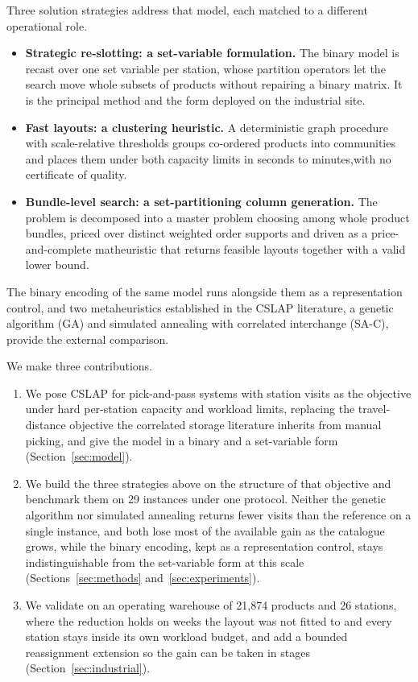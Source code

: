 \documentclass[]{interact}
\begin{document}
Three solution strategies address that model, each matched to a different operational role.
\begin{itemize}
\item \textbf{Strategic re-slotting: a set-variable formulation.} The binary model is recast over one set variable per station, whose partition operators let the search move whole subsets of products without repairing a binary matrix. It is the principal method and the form deployed on the industrial site.
\item \textbf{Fast layouts: a clustering heuristic.} A deterministic graph procedure with scale-relative thresholds groups co-ordered products into communities and places them under both capacity limits in seconds to minutes,with no certificate of quality.
\item \textbf{Bundle-level search: a set-partitioning column generation.} The problem is decomposed into a master problem choosing among whole product bundles, priced over distinct weighted order supports and driven as a price-and-complete matheuristic that returns feasible layouts together with a valid lower bound.
\end{itemize}
The binary encoding of the same model runs alongside them as a representation control, and two metaheuristics established in the CSLAP literature, a genetic algorithm (GA) and simulated annealing with correlated interchange (SA-C), provide the external comparison.

We make three contributions.
\begin{enumerate}
\item We pose CSLAP for pick-and-pass systems with station visits as the objective under hard per-station capacity and workload limits, replacing the travel-distance objective the correlated storage literature inherits from manual picking, and give the model in a binary and a set-variable form (Section~\ref{sec:model}).
\item We build the three strategies above on the structure of that objective and benchmark them on 29 instances under one protocol. Neither the genetic algorithm nor simulated annealing returns fewer visits than the reference on a single instance, and both lose most of the available gain as the catalogue grows, while the binary encoding, kept as a representation control, stays indistinguishable from the set-variable form at this scale (Sections~\ref{sec:methods} and~\ref{sec:experiments}).
\item We validate on an operating warehouse of 21,874 products and 26 stations, where the reduction holds on weeks the layout was not fitted to and every station stays inside its own workload budget, and add a bounded reassignment extension so the gain can be taken in stages (Section~\ref{sec:industrial}).
\end{enumerate}
\end{document}
